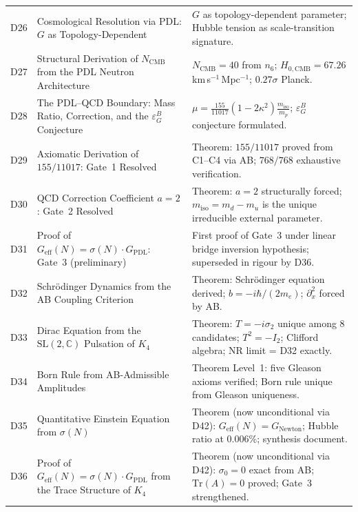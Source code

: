 \documentclass[11pt,a4paper]{article}
\theoremstyle{plain}
\theoremstyle{definition}
\theoremstyle{remark}
\newcommand{\Geff}{G_{\mathrm{eff}}}
\newcommand{\GPDL}{G_{\mathrm{PDL}}}
\newcommand{\sigmaN}{\sigma(N)}
\newcommand{\epsGeomB}{\varepsilon_G^B}
\begin{document}
\begin{longtable}{L{1.3cm}L{3.8cm}L{8.0cm}}
D26 & Cosmological Resolution via PDL: $G$ as Topology-Dependent~\cite{D26} & $G$ as topology-dependent parameter; Hubble tension as scale-transition signature.\\[0.3em]
D27 & Structural Derivation of $N_{\mathrm{CMB}}$ from the PDL Neutron Architecture~\cite{D27} & $N_{\mathrm{CMB}}=40$ from $n_6$; $H_{0,\mathrm{CMB}}=67.26$ km\,s$^{-1}$\,Mpc$^{-1}$; $0.27\sigma$ Planck.\\[0.3em]
D28 & The PDL--QCD Boundary: Mass Ratio, Correction, and the $\epsGeomB$ Conjecture~\cite{D28} & $\mu = \frac{155}{11017}(1-2\kappa^2)\frac{m_{\mathrm{iso}}}{m_p}$; $\epsGeomB$ conjecture formulated.\\[0.3em]
D29 & Axiomatic Derivation of $155/11017$: Gate~1 Resolved~\cite{D29} & \textcolor{proofblue}{Theorem}: $155/11017$ proved from C1--C4 via AB; $768/768$ exhaustive verification.\\[0.3em]
D30 & QCD Correction Coefficient $a=2$: Gate~2 Resolved~\cite{D30} & \textcolor{proofblue}{Theorem}: $a=2$ structurally forced; $m_{\mathrm{iso}}=m_d-m_u$ is the unique irreducible external parameter.\\[0.3em]
D31 & Proof of $\Geff(N)=\sigmaN\cdot\GPDL$: Gate~3 (preliminary)~\cite{D31} & First proof of Gate~3 under linear bridge inversion hypothesis; superseded in rigour by D36.\\[0.3em]
D32 & Schr\"odinger Dynamics from the AB Coupling Criterion~\cite{D32} & \textcolor{proofblue}{Theorem}: Schr\"odinger equation derived; $b=-i\hbar/(2m_e)$; $\partial_x^2$ forced by AB.\\[0.3em]
D33 & Dirac Equation from the $\mathrm{SL}(2,\mathbb{C})$ Pulsation of $K_4$~\cite{D33} & \textcolor{proofblue}{Theorem}: $T=-i\sigma_2$ unique among 8 candidates; $T^2=-I_2$; Clifford algebra; NR limit = D32 exactly.\\[0.3em]
D34 & Born Rule from AB-Admissible Amplitudes~\cite{D34} & \textcolor{proofblue}{Theorem} Level~1: five Gleason axioms verified; Born rule unique from Gleason uniqueness.\\[0.3em]
D35 & Quantitative Einstein Equation from $\sigmaN$~\cite{D35} & \textcolor{proofblue}{Theorem} (now unconditional via D42): $G_{\mathrm{eff}}(N)=G_{\mathrm{Newton}}$; Hubble ratio at $0.006\%$; synthesis document.\\[0.3em]
D36 & Proof of $\Geff(N)=\sigmaN\cdot\GPDL$ from the Trace Structure of $K_4$~\cite{D36} & \textcolor{proofblue}{Theorem} (now unconditional via D42): $\sigma_0=0$ exact from AB; $\mathrm{Tr}(A)=0$ proved; Gate~3 strengthened.\\[0.4em]

\end{longtable}
\end{document}
